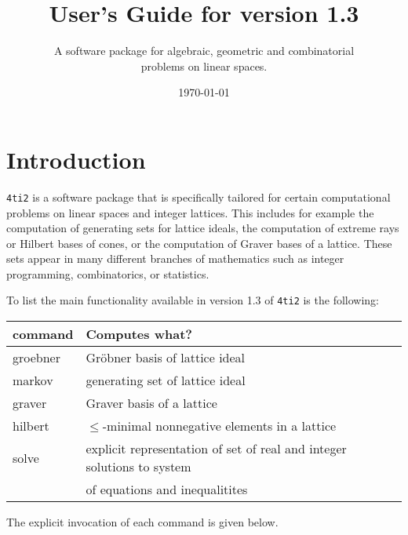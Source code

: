 \documentclass[12pt]{article}
\title{User's Guide for \FourTiTwo{} version 1.3}
\author{A software package for algebraic, 
geometric and combinatorial\\ problems on linear spaces.}
\date{\today}
\theoremstyle{definition}
\newcommand{\FourTiTwo}{{\tt 4ti2}}
\begin{document}
\maketitle

\newpage

\tableofcontents



\section{Introduction}


\FourTiTwo{} is a software package that is specifically tailored for
certain computational problems on linear spaces and integer lattices. This includes for example the computation of generating sets for lattice ideals, the computation of extreme rays or Hilbert bases of cones, or the computation of Graver bases of a lattice. These sets appear in many different branches of
mathematics such as integer programming, combinatorics, or statistics.

To list the main functionality available in version 1.3 of
\FourTiTwo{} is the following:

\begin{tabular}{|l|l|}
\hline
command & Computes what?\\
\hline
groebner & Gr\"obner basis of lattice ideal\\
markov  & generating set of lattice ideal\\
graver  & Graver basis of a lattice\\
hilbert & $\leq$-minimal nonnegative elements in a lattice\\
solve   & explicit representation of set of real and integer solutions 
	  to system\\ 
	& of equations and inequalitites\\
\hline
\end{tabular}

The explicit invocation of each command is given below.




\end{document}
